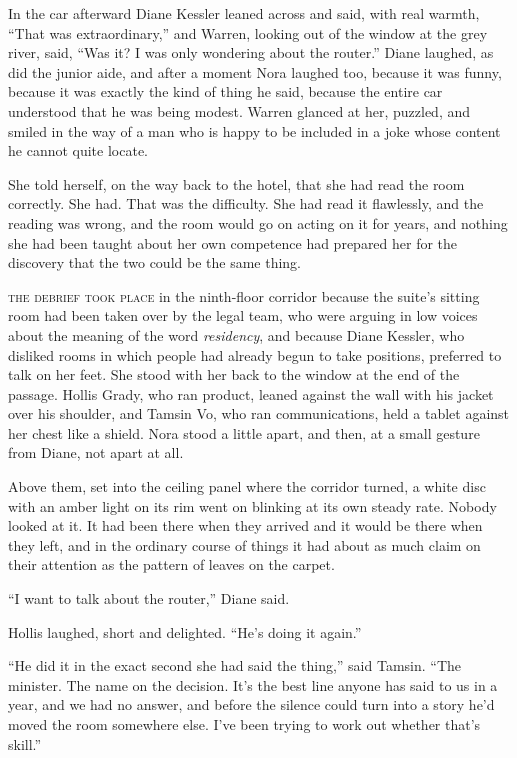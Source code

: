 In the car afterward Diane Kessler leaned across and said, with real warmth, ``That was extraordinary,'' and Warren, looking out of the window at the grey river, said, ``Was it? I was only wondering about the router.'' Diane laughed, as did the junior aide, and after a moment Nora laughed too, because it was funny, because it was exactly the kind of thing he said, because the entire car understood that he was being modest. Warren glanced at her, puzzled, and smiled in the way of a man who is happy to be included in a joke whose content he cannot quite locate.

She told herself, on the way back to the hotel, that she had read the room correctly. She had. That was the difficulty. She had read it flawlessly, and the reading was wrong, and the room would go on acting on it for years, and nothing she had been taught about her own competence had prepared her for the discovery that the two could be the same thing.


\textsc{the debrief took place} in the ninth-floor corridor because the suite's sitting room had been taken over by the legal team, who were arguing in low voices about the meaning of the word \emph{residency}, and because Diane Kessler, who disliked rooms in which people had already begun to take positions, preferred to talk on her feet. She stood with her back to the window at the end of the passage. Hollis Grady, who ran product, leaned against the wall with his jacket over his shoulder, and Tamsin Vo, who ran communications, held a tablet against her chest like a shield. Nora stood a little apart, and then, at a small gesture from Diane, not apart at all.

Above them, set into the ceiling panel where the corridor turned, a white disc with an amber light on its rim went on blinking at its own steady rate. Nobody looked at it. It had been there when they arrived and it would be there when they left, and in the ordinary course of things it had about as much claim on their attention as the pattern of leaves on the carpet.

``I want to talk about the router,'' Diane said.

Hollis laughed, short and delighted. ``He's doing it again.''

``He did it in the exact second she had said the thing,'' said Tamsin. ``The minister. The name on the decision. It's the best line anyone has said to us in a year, and we had no answer, and before the silence could turn into a story he'd moved the room somewhere else. I've been trying to work out whether that's skill.''

